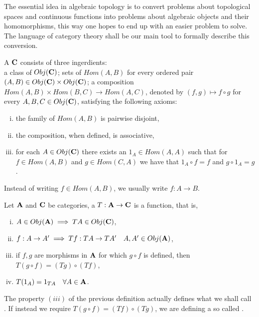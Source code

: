 \documentclass[../1.tex]{subfiles}
\begin{document}
    The essential idea in algebraic topology is to convert problems about topological spaces and continuous functions into
    problems about algebraic objects and their homomorphisms, this way one hopes to end up with an easier problem to solve. 
    The language of category theory shall be our main tool to formally describe this conversion.

    \begin{defn}
        A  $\textbf{C}$ consists of three ingerdients:\\
        a class of  $Obj(\textbf{C})$; sets of 
        $Hom(A,B)$ for every ordered pair $(A,B) \in Obj(\textbf{C}) \times Obj(\textbf{C})$; a composition $Hom(A,B) \times Hom(B,C) \to Hom(A,C)$, denoted
        by $(f,g) \mapsto f \circ g$ for every $A,B,C \in Obj(\textbf{C})$, satisfying the following axioms:
        \begin{enumerate}[(i)]
            \item the family of $Hom(A,B)$ is pairwise disjoint,
            \item the composition, when defined, is associative,
            \item for each $A \in Obj(\textbf{C})$ there exists an  $1_A \in Hom(A,A)$ such that for $f \in Hom(A,B)$ and $g \in Hom(C,A)$
                  we have that $1_A \circ f = f$ and $g \circ 1_A = g$.
        \end{enumerate}
    \end{defn}

    Instead of writing $f \in Hom(A,B)$, we usually write $f : A \to B$. 

    \begin{defn}
        Let $\textbf{A}$ and $\textbf{C}$ be categories, a  $T : \textbf{A} \to \textbf{C}$ is a function, that is, 
        \begin{enumerate}[(i)]
            \item $A \in Obj(\textbf{A}) \implies TA \in Obj(\textbf{C})$,
            \item $f:A \to A' \implies Tf: TA \to TA' \quad A,A' \in Obj(\textbf{A})$,
            \item if $f,g$ are morphisms in $\textbf{A}$ for which $g \circ f$ is defined, then $T(g \circ f) = (Tg) \circ (Tf)$,
            \item $T(1_A)= 1_{TA} \quad \forall A \in \textbf{A}$.
        \end{enumerate}
    \end{defn}

    The property $(iii)$ of the previous definition actually defines what we shall call .
    If instead we require $T(g \circ f) = (Tf) \circ (Tg)$, we are defining a so called .
\end{document}
